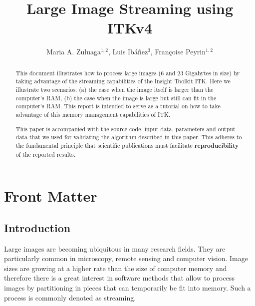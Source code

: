\documentclass{InsightArticle}
\title{Large Image Streaming using ITKv4}
\author{Maria A. Zuluaga$^{1,2}$, Luis Ib\'{a}\~{n}ez$^{3}$, Fran\c{c}oise Peyrin$^{1,2}$}
\newcommand{\IJhandlerIDnumber}{3263}
\begin{document}
%
%
\IJhandlefooter{\IJhandlerIDnumber}


\ifpdf
\else
\fi


\maketitle


\ifhtml
\chapter*{Front Matter\label{front}}
\fi


\begin{abstract}
\noindent
This document illustrates how to process large images (6 and 23 Gigabytes in
size) by taking advantage of the streaming capabilities of the Insight Toolkit
ITK.  Here we illustrate two scenarios: (a) the case when the image itself is
larger than the computer's RAM, (b) the case when the image is large but still
can fit in the computer's RAM. This report is intended to serve as a tutorial
on how to take advantage of this memory management capabilities of ITK.

This paper is accompanied with the source code, input data, parameters and
output data that we used for validating the algorithm described in this paper.
This adheres to the fundamental principle that scientific publications must
facilitate \textbf{reproducibility}~\cite{Stodden2009} of the reported results.
\end{abstract}

\tableofcontents

\section{Introduction}

Large images are becoming ubiquitous in many research fields. They are
particularly common in microscopy, remote sensing and computer vision.  Image
sizes are growing at a higher rate than the size of computer memory and
therefore there is a great interest in software methods that allow to process
images by partitioning in pieces that can temporarily be fit into memory. Such a
process is commonly denoted as streaming.
\end{document}
